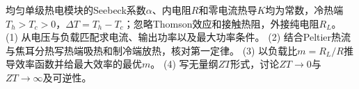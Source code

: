 均匀单级热电模块的Seebeck系数\(\alpha\)、内电阻\(R\)和零电流热导\(K\)均为常数，冷热端\(T_h>T_c>0\)，\(\Delta T=T_h-T_c\)；忽略Thomson效应和接触热阻，外接纯电阻\(R_L\)。
(1) 从电压与负载匹配求电流、输出功率以及最大功率条件。
(2) 结合Peltier热流与焦耳分热写热端吸热和制冷端放热，核对第一定律。
(3) 以负载比\(m=R_L/R\)推导效率函数并给最大效率的最优\(m\)。
(4) 写无量纲\(ZT\)形式，讨论\(ZT\to0\)与\(ZT\to\infty\)及可逆性。
